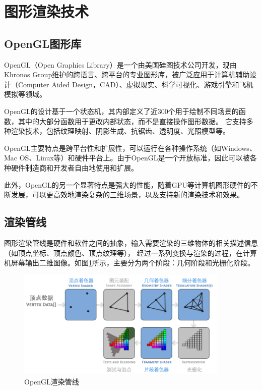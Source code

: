 \section{图形渲染技术}

\subsection{OpenGL图形库}

\par OpenGL（Open Graphics Library）是一个由美国硅图技术公司开发，现由Khronos Group维护的跨语言、跨平台的专业图形库，被广泛应用于计算机辅助设计（Computer Aided Design，CAD）、虚拟现实、科学可视化、游戏引擎和飞机模拟等领域。

\par OpenGL的设计基于一个状态机，其内部定义了近300个用于绘制不同场景的函数，其中的大部分函数用于更改内部状态，而不是直接操作图形数据。
它支持多种渲染技术，包括纹理映射、阴影生成、抗锯齿、透明度、光照模型等。

\par OpenGL主要特点是跨平台性和扩展性，可以运行在各种操作系统（如Windows、Mac OS、Linux等）和硬件平台上。由于OpenGL是一个开放标准，因此可以被各种硬件制造商和开发者自由地使用和扩展。

\par 此外，OpenGL的另一个显著特点是强大的性能，随着GPU等计算机图形硬件的不断发展，可以更高效地渲染复杂的三维场景，以及支持新的渲染技术和效果。

\subsection{渲染管线}
\par 图形渲染管线\cite{OpenGL_graphics_system}是硬件和软件之间的抽象，输入需要渲染的三维物体的相关描述信息（如顶点坐标、顶点颜色、顶点纹理等），
经过一系列变换与渲染的过程，在计算机屏幕输出二维图像。如图\ref{fig:glpipeline}所示，主要分为两个阶段：几何阶段和光栅化阶段。

\begin{figure}[htb]
	\centering
	\includegraphics[width=0.9\textwidth]{figures/opengl_pipeline.png}
	\caption{OpenGL渲染管线}
	\label{fig:glpipeline}
\end{figure}

